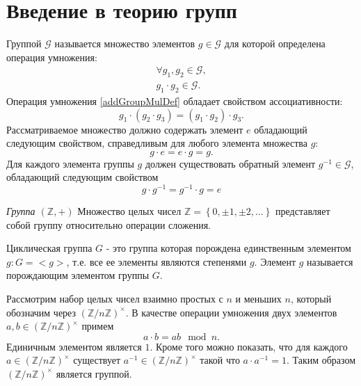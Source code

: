 \section{Введение в теорию групп}
\begin{definition}
Группой $\mathcal{G}$ называется множество элементов $g \in
\mathcal{G}$ для которой определена 
операция умножения:
\begin{eqnarray}
\forall g_1,g_2 \in \mathcal{G},
\nonumber \\
g_1 \cdot g_2 \in \mathcal{G}.
\label{addGroupMulDef}
\end{eqnarray}
Операция умножения \autoref{addGroupMulDef} обладает свойством
ассоциативности:
\begin{equation}
g_1 \cdot \left( g_2 \cdot g_3 \right ) = 
\left( g_1 \cdot  g_2 \right ) \cdot g_3.
\nonumber
\end{equation}
Рассматриваемое множество должно содержать элемент $e$ обладающий
следующим свойством, справедливым для любого элемента множества $g$:
\begin{equation}
g \cdot e = e \cdot g = g.
\nonumber
\end{equation}
Для каждого элемента группы $g$ должен существовать обратный
элемент $g^{-1} \in \mathcal{G}$, обладающий следующим свойством
\begin{equation}
g \cdot g^{-1} = g^{-1} \cdot g = e
\nonumber
\end{equation}
\label{defAddGroup}
\end{definition}

\begin{example}
\emph{Группа $\left(\mathbb{Z}, +\right)$}
Множество целых чисел $\mathbb{Z} = \left\{0, \pm1, \pm2,
\dots\right\}$ представляет собой группу относительно операции сложения.
\nonumber
\end{example}

\begin{definition}
Циклическая группа $G$ - это группа которая порождена единственным
элементом $g: G = <g>$, т.е. все ее элементы являются степенями $g$.
Элемент $g$ называется порождающим элементом группы $G$.
\label{def:add:algebra:cyclic_group}
\end{definition}

\begin{definition}
Рассмотрим набор целых чисел взаимно простых с $n$ и меньших $n$,
который обозначим через $\left(\mathbb{Z}/n\mathbb{Z}\right)^\times$. В
качестве операции умножения двух элементов $a,b \in
\left(\mathbb{Z}/n\mathbb{Z}\right)^\times$ примем
\[
a \cdot b = ab \mod n.
\]
Единичным элементом является $1$. Кроме того можно показать, что для
каждого $a \in \left(\mathbb{Z}/n\mathbb{Z}\right)^\times$
существует $a^{-1} \in \left(\mathbb{Z}/n\mathbb{Z}\right)^\times$
такой что $a \cdot a^{-1} = 1$. Таким образом
$\left(\mathbb{Z}/n\mathbb{Z}\right)^\times$ является группой.
\label{def:add:algebra:mult_group}
\end{definition}

